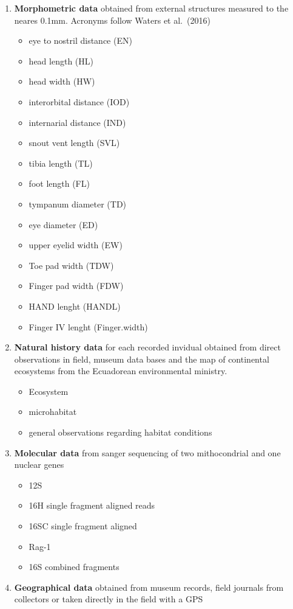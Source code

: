\documentclass[
]{book}
\providecommand{\tightlist}{%
  \setlength{\itemsep}{0pt}\setlength{\parskip}{0pt}}
\begin{document}
\begin{enumerate}
\def\labelenumi{\arabic{enumi}.}
\tightlist
\item
  \textbf{Morphometric data} obtained from external structures measured to the neares 0.1mm. Acronyms follow Waters et al.~(2016)

  \begin{itemize}
  \tightlist
  \item
    eye to nostril distance (EN)
  \item
    head length (HL)
  \item
    head width (HW)
  \item
    interorbital distance (IOD)
  \item
    internarial distance (IND)
  \item
    snout vent length (SVL)
  \item
    tibia length (TL)
  \item
    foot length (FL)
  \item
    tympanum diameter (TD)
  \item
    eye diameter (ED)
  \item
    upper eyelid width (EW)
  \item
    Toe pad width (TDW)
  \item
    Finger pad width (FDW)
  \item
    HAND lenght (HANDL)
  \item
    Finger IV lenght (Finger.width)
  \end{itemize}
\item
  \textbf{Natural history data} for each recorded invidual obtained from direct observations in field, museum data bases and the map of continental ecosystems from the Ecuadorean environmental ministry.

  \begin{itemize}
  \tightlist
  \item
    Ecosystem
  \item
    microhabitat
  \item
    general observations regarding habitat conditions
  \end{itemize}
\item
  \textbf{Molecular data} from sanger sequencing of two mithocondrial and one nuclear genes

  \begin{itemize}
  \tightlist
  \item
    12S
  \item
    16H single fragment aligned reads
  \item
    16SC single fragment aligned
  \item
    Rag-1
  \item
    16S combined fragments
  \end{itemize}
\item
  \textbf{Geographical data} obtained from museum records, field journals from collectors or taken directly in the field with a GPS


\end{enumerate}
\end{document}
